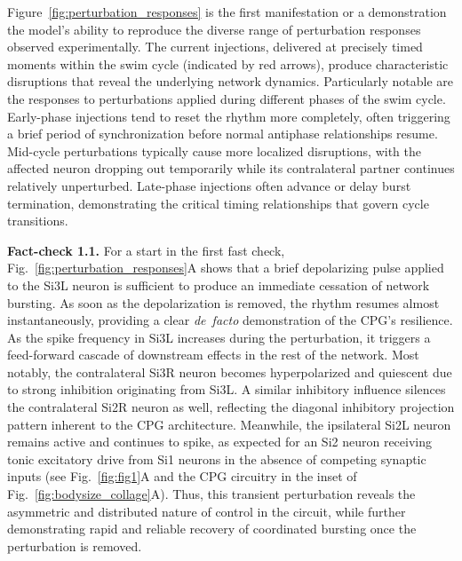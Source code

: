 \documentclass[nofootinbib,aip,amsmath,amssymb,reprint,twocolumn,10pt]{revtex4-2}
\begin{document}
Figure~\ref{fig:perturbation_responses} is the first manifestation or a demonstration the model's ability to reproduce the diverse range of perturbation responses observed experimentally. The current injections, delivered at precisely timed moments within the swim cycle (indicated by red arrows), produce characteristic disruptions that reveal the underlying network dynamics. Particularly notable are the responses to perturbations applied during different phases of the swim cycle. Early-phase injections tend to reset the rhythm more completely, often triggering a brief period of synchronization before normal antiphase relationships resume. Mid-cycle perturbations typically cause more localized disruptions, with the affected neuron dropping out temporarily while its contralateral partner continues relatively unperturbed. Late-phase injections often advance or delay burst termination, demonstrating the critical timing relationships that govern cycle transitions.


{\bf Fact-check 1.1.}
For a start in the first fast check, Fig.~\ref{fig:perturbation_responses}A shows that a brief depolarizing pulse applied to the Si3L neuron is sufficient to produce an immediate cessation of network bursting. As soon as the depolarization is removed, the rhythm resumes almost instantaneously, providing a clear {\em de~facto} demonstration of the CPG's resilience. As the spike frequency in Si3L increases during the perturbation, it triggers a feed-forward cascade of downstream effects in the rest of the network. Most notably, the contralateral Si3R neuron becomes hyperpolarized and quiescent due to strong inhibition originating from Si3L. A similar inhibitory influence silences the contralateral Si2R neuron as well, reflecting the diagonal inhibitory projection pattern inherent to the CPG architecture. Meanwhile, the ipsilateral Si2L neuron remains active and continues to spike, as expected for an Si2 neuron receiving tonic excitatory drive from Si1 neurons in the absence of competing synaptic inputs (see Fig.~\ref{fig:fig1}A and the CPG circuitry in the inset of Fig.~\ref{fig:bodysize_collage}A). Thus, this transient perturbation reveals the asymmetric and distributed nature of control in the circuit, while further demonstrating rapid and reliable recovery of coordinated bursting once the perturbation is removed.      

\end{document}
